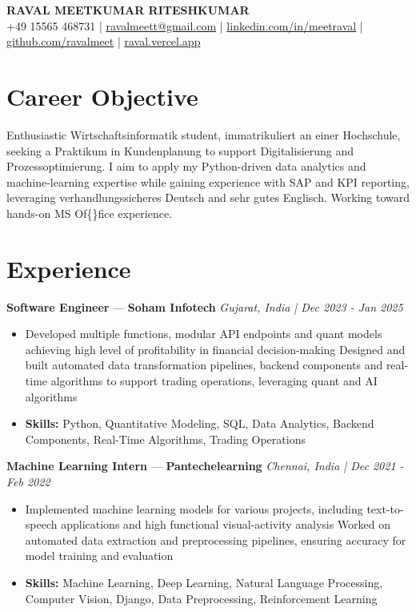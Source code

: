 \documentclass[a4paper,10pt]{article}
\begin{document}
\begin{center}
  {\Large\bfseries RAVAL MEETKUMAR RITESHKUMAR}\\[2pt]
  {\small +49 15565 468731 \;|\; \href{mailto:ravalmeett@gmail.com}{ravalmeett@gmail.com} \;|\; \href{https://www.linkedin.com/in/meetraval/}{linkedin.com/in/meetraval} \;|\; \href{https://github.com/ravalmeet}{github.com/ravalmeet} \;|\; \href{https://raval.vercel.app/}{raval.vercel.app}}
\end{center}
\vspace{-3pt}

\section*{Career Objective}
Enthusiastic Wirtschaftsinformatik student, immatrikuliert an einer Hochschule, seeking a Praktikum in Kundenplanung to support Digitalisierung and Prozessoptimierung. I aim to apply my Python-driven data analytics and machine-learning expertise while gaining experience with SAP and KPI reporting, leveraging verhandlungssicheres Deutsch and sehr gutes Englisch. Working toward hands-on MS Of\{\}fice experience.\par

\section*{Experience}
\textbf{Software Engineer} — \textbf{Soham Infotech} \hfill \textit{Gujarat, India \;|\; Dec 2023 - Jan 2025}\par
\vspace{1pt}
\begin{itemize}
  \item Developed multiple functions, modular API endpoints and quant models achieving high level of profitability in financial decision-making Designed and built automated data transformation pipelines, backend components and real-time algorithms to support trading operations, leveraging quant and AI algorithms
  \item \textbf{Skills:} Python, Quantitative Modeling, SQL, Data Analytics, Backend Components, Real-Time Algorithms, Trading Operations
\end{itemize}
\vspace{3pt}
\textbf{Machine Learning Intern} — \textbf{Pantechelearning} \hfill \textit{Chennai, India \;|\; Dec 2021 - Feb 2022}\par
\vspace{1pt}
\begin{itemize}
  \item Implemented machine learning models for various projects, including text-to-speech applications and high functional visual-activity analysis Worked on automated data extraction and preprocessing pipelines, ensuring accuracy for model training and evaluation
  \item \textbf{Skills:} Machine Learning, Deep Learning, Natural Language Processing, Computer Vision, Django, Data Preprocessing, Reinforcement Learning
\end{itemize}
\end{document}
